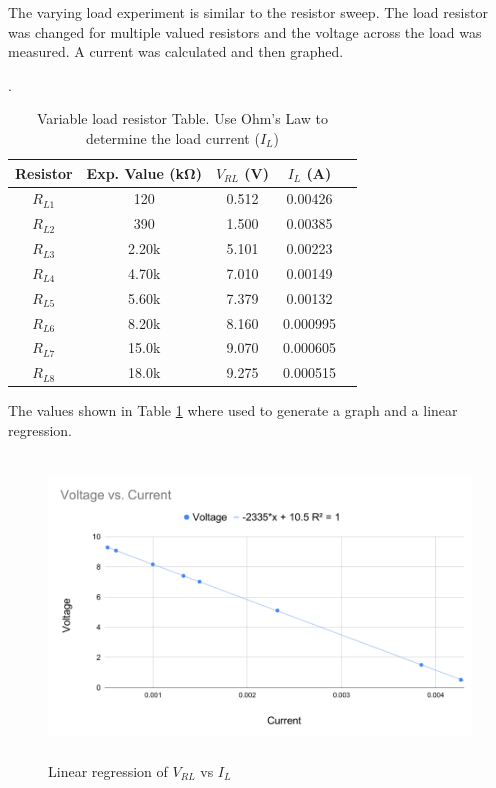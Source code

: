 \documentclass[11pt]{article}
\begin{document}
The varying load experiment is similar to the resistor sweep. The load resistor was changed for multiple valued resistors and the voltage across the load was measured. A current was calculated and then graphed.

\begin{table}[htbp]
	\centering
	\caption{Variable load resistor Table.  Use Ohm's Law to determine the load current ($I_L$)}.
	\label{Table:Lab3LoadResistors}
	\begin{tabular}{|c||c|c|c|c|}
		\hline
		Resistor &Exp. Value (\si{\kilo\ohm}) &$V_{RL}$ (\si{\volt}) & $I_L$ (\si{\ampere}) \\
		\hline
		$R_{L1}$ & 120   & 0.512 & 0.00426 \\	 \hline 
		$R_{L2}$ & 390   & 1.500 & 0.00385 \\	 \hline 
		$R_{L3}$ & 2.20k & 5.101 & 0.00223 \\	 \hline 
		$R_{L4}$ & 4.70k & 7.010 & 0.00149 \\	 \hline 
		$R_{L5}$ & 5.60k & 7.379 & 0.00132 \\	 \hline 
		$R_{L6}$ & 8.20k & 8.160 & 0.000995 \\	 \hline
		$R_{L7}$ & 15.0k & 9.070 & 0.000605 \\	 \hline
		$R_{L8}$ & 18.0k & 9.275 & 0.000515 \\	 \hline 
	\end{tabular}
\end{table}

The values shown in Table \ref{Table:Lab3LoadResistors} where used to generate a graph and a linear regression.
\pagebreak

\begin{figure}[h!]
	\begin{center}
		\includegraphics[height=8cm]{volt_vs_current}
		\caption{Linear regression of $V_{RL}$ vs $I_L$}
		\label{Fig:ExperimentRegression}
	\end{center}
\end{figure}
\end{document}
